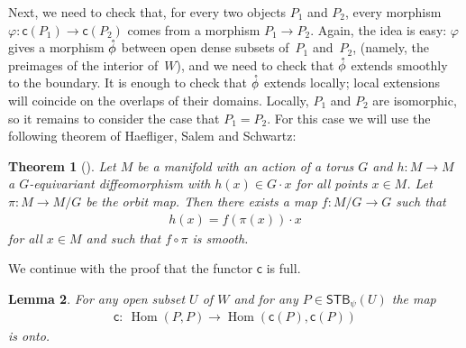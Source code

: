 \documentclass[pdftex]{sigma}
\numberwithin{equation}{section}
\newtheorem{Lemma}{Lemma}[section]
\newtheorem{Theorem}[Lemma]{Theorem}
\begin{document}
Next, we need to check that, for every two objects $P_1$ and $P_2$,
every morphism $\varphi \colon {\textsf{c}}(P_1) \to {\textsf{c}}(P_2)$
comes from a morphism $P_1 \to P_2$.
Again, the idea is easy: $\varphi$ gives a morphism ${\mathaccent23{\phi}}$
between open dense subsets of~$P_1$ and~$P_2$,
(namely, the preimages of the interior of~$W$),
and we need to check that ${\mathaccent23{\phi}}$ extends smoothly to the boundary.
It is enough to check that ${\mathaccent23{\phi}}$ extends locally;
local extensions will coincide on the overlaps of their domains.
Locally, $P_1$ and $P_2$ are isomorphic, so it remains to consider the
case that $P_1 = P_2$.  For this case we will use
the following theorem of Haef\/liger, Salem and Schwartz:

\begin{Theorem}[] \label{thm:HSS}
Let
  $M$ be a manifold with an action of a torus $G$ and $h\colon M\to M$ a
  $G$-equivariant diffeomorphism with $h(x)\in G\cdot x$ for all
  points $x\in M$. Let $\pi\colon  M \to M/G$ be the orbit map.
  Then there exists a map $f\colon M/G\to G$ such that
\begin{gather*}
h(x) = f(\pi (x))\cdot x
\end{gather*}
for all $x\in M$ and such that $f \circ \pi$ is smooth.
\end{Theorem}

We continue with the proof that the functor ${\textsf{c}}$ is full.

\begin{Lemma} \label{lem4:2}
For any open subset $U$ of $W$ and for any $P\in {\textsf{STB}}_\psi(U)$ the map
\begin{gather*}
{\textsf{c}}\colon \ \operatorname{Hom}(P,P)\to \operatorname{Hom} ({\textsf{c}}(P), {\textsf{c}}(P))
\end{gather*}
is onto.
\end{Lemma}
\end{document}
